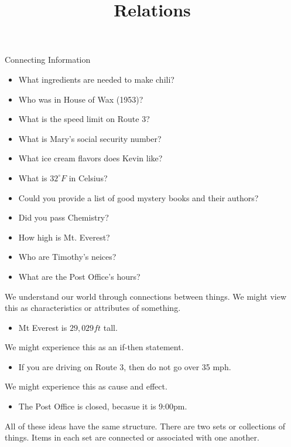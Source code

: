 \documentclass{ximera}
\title{Relations}
\begin{document}
\begin{abstract}

\end{abstract}
\maketitle

\begin{observation} Connecting Information

\begin{itemize} 
\item What ingredients are needed to make chili?
\item Who was in House of Wax (1953)?
\item What is the speed limit on Route 3?
\item What is Mary's social security number?
\item What ice cream flavors does Kevin like?
\item What is $32^\circ F$ in Celsius?
\item Could you provide a list of good mystery books and their authors?
\item Did you pass Chemistry?
\item How high is Mt. Everest?
\item Who are Timothy's neices?
\item What are the Post Office's hours?
\end{itemize}

We understand our world through connections between things. We might view this as characteristics or attributes of something. 
\begin{itemize}
\item Mt Everest is $29,029 ft$ tall.
\end{itemize}


We might experience this as an if-then statement.
\begin{itemize}
\item If you are driving on Route 3, then do not go over 35 mph.
\end{itemize}



We might experience this as cause and effect.
\begin{itemize}
\item The Post Office is closed, becasue it is 9:00pm.
\end{itemize}



All of these ideas have the same structure.  There are two sets or collections of things.  Items in each set are connected or associated with one another.




\end{observation}
\end{document}
